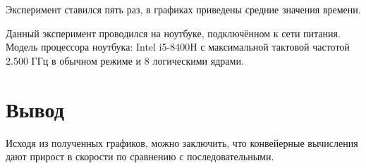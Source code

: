 Эксперимент ставился пять раз, в графиках приведены средние значения времени.

Данный эксперимент проводился на ноутбуке, подключённом к сети питания. Модель процессора ноутбука: Intel i5-8400H с максимальной тактовой частотой 2.500 ГГц в обычном режиме и 8 логическими ядрами.

\section{Вывод}
Исходя из полученных графиков, можно заключить, что конвейерные вычисления дают прирост в скорости по сравнению с последовательными.

